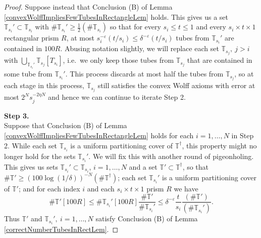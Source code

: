 \documentclass[letterpaper, reqno,11pt]{article}
\numberwithin{equation}{section}
\newcommand{\eps}{\varepsilon}
\newcommand{\tubes}{\mathbb{T}}
\numberwithin{thm}{section}
\theoremstyle{remark}
\begin{document}
\begin{proof}
Suppose instead that Conclusion (B) of Lemma \ref{convexWolffImpliesFewTubesInRectangleLem} holds. This gives us a set $\tubes_{s_i}'\subset \tubes_{s_i}$  with $\#\tubes_{s_i}'\geq\frac{1}{2}(\#\tubes_{s_i})$ so that for every $s_i\leq t \leq 1$ and every $s_i\times t\times 1$ rectangular prism $R$, at most $s_i^{-\eps}(t/s_i)\leq\delta^{-\eps}(t/s_i)$ tubes from $\tubes_{s_i}'$ are contained in $100R$. Abusing notation slightly, we will replace each set $\tubes_{s_j},\ j>i$ with $\bigcup_{\tubes_{s_i}'}\tubes_{s_j}[T_{s_i}]$, i.e.~we only keep those tubes from $\tubes_{s_j}$ that are contained in some tube from $\tubes_{s_i}'$. This process discards at most half the tubes from $\tubes_{s_j}$, so at each stage in this process, $\tubes_{s_j}$ still satisfies the convex Wolff axioms with error at most $2^N s_j^{-2\eta N}$ and hence we can continue to iterate Step 2.

\medskip

\noindent \textbf{Step 3.}\\
Suppose that Conclusion (B) of Lemma \ref{convexWolffImpliesFewTubesInRectangleLem} holds for each $i=1,\ldots,N$ in Step 2. While each set $\tubes_{s_i}$ is a uniform partitioning cover of $\tubes^\dag$, this property might no longer hold for the sets $\tubes_{s_i}'$. We will fix this with another round of pigeonholing. This gives us sets $\tubes_{s_i}'\subset\tubes_{s_i}$, $i=1,\ldots,N$ and a set $\tubes'\subset\tubes^\dag$, so that $\#\tubes' \geq (100 \log(1/\delta))^{-N}(\#\tubes^\dag)$; each set $\tubes_{s_i}'$ is a uniform partitioning cover of $\tubes'$; and for each index $i$ and each $s_i\times t\times 1$ prism $R$ we have
\[
\#\tubes'[100R] \leq \#\tubes_{s_i}'[100R] \frac{\#\tubes'}{\#\tubes_{s_i}'} \leq \delta^{-\eps}\frac{t}{s_i}\frac{(\#\tubes')}{(\#\tubes_{s_i}')}.
\]
Thus $\tubes'$ and $\tubes_{s_i}',\ i=1,\ldots,N$ satisfy Conclusion (B) of Lemma \ref{correctNumberTubesInRectLem}.
\end{proof}


\end{document}
